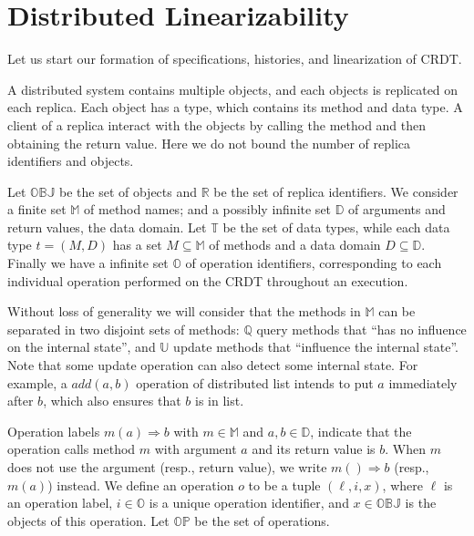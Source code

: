 
\section{Distributed Linearizability}
\label{sec:distributed-lin}

Let us start our formation of specifications, histories, and linearization of CRDT. 

A distributed system contains multiple objects, and each objects is replicated on each replica. Each object has a type, which contains its method and data type. A client of a replica interact with the objects by calling the method and then obtaining the return value. Here we do not bound the number of replica identifiers and objects. 

Let $\mathbb{OBJ}$ be the set of objects and $\mathbb{R}$ be the set of replica identifiers. We consider a finite set $\mathbb{M}$ of method names; and a possibly infinite set $\mathbb{D}$ of arguments and return values, the data domain. Let $\mathbb{T}$ be the set of data types, while each data type $t = (M,D)$ has a set $M \subseteq \mathbb{M}$ of methods and a data domain $D \subseteq \mathbb{D}$. Finally we have a infinite set $\mathbb{O}$ of operation identifiers, corresponding to each individual operation performed on the CRDT throughout an execution. 

Without loss of generality we will consider that the methods in $\mathbb{M}$ can be separated in two disjoint sets of methods: $\mathbb{Q}$ query methods that ``has no influence on the internal state'', and $\mathbb{U}$ update methods that ``influence the internal state''. Note that some update operation can also detect some internal state. For example, a $add(a,b)$ operation of distributed list intends to put $a$ immediately after $b$, which also ensures that $b$ is in list. 

Operation labels \mbox{$m(a)\Rightarrow b$} with $m \in \mathbb{M}$ and $a,b \in \mathbb{D}$, indicate that the operation calls method $m$ with argument $a$ and its return value is $b$. When $m$ does not use the argument (resp., return value), we write $m()\Rightarrow b$ (resp., $m(a)$) instead. We define an operation $o$ to be a tuple $(\ell,i,x)$, where $\ell$ is an operation label, $i \in \mathbb{O}$ is a unique operation identifier, and $x \in \mathbb{OBJ}$ is the objects of this operation. Let $\mathbb{OP}$ be the set of operations.

